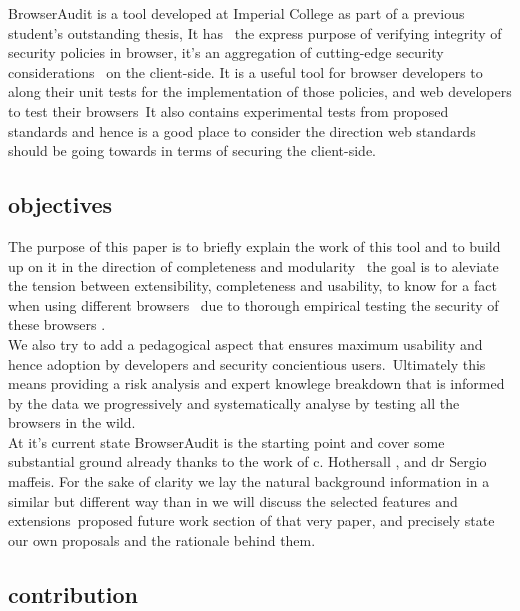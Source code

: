 \documentclass[a4paper,12pt]{paper}
\begin{document}
BrowserAudit is a tool developed at Imperial College as part of a previous student's outstanding thesis, It has \
the express purpose of verifying integrity of security policies in browser, it's an aggregation of cutting-edge security considerations \ 
on the client-side. 
It is a useful tool for browser developers to along their unit tests for the implementation of those policies, and web developers to test their browsers\
It also contains experimental tests from proposed standards and hence is a good place to consider the direction web standards should be going towards in terms of securing the client-side.\


\subsection{objectives}

The purpose of this paper is to briefly explain the work of this tool and to build up on it in the direction of completeness and modularity \
the goal is to aleviate the tension between extensibility, completeness and usability, to know for a fact when using different browsers \
due to thorough  empirical testing the security of these browsers .\\


We also try to add a pedagogical aspect that ensures maximum usability and hence adoption by developers and security concientious users.\ 
Ultimately this means providing a risk analysis and expert knowlege breakdown that is informed by the data we progressively and systematically analyse by testing all the browsers in the wild.\\

At it's current state BrowserAudit is the starting point and cover some substantial ground already thanks to the work of c. Hothersall , and dr Sergio maffeis.
For the sake of clarity we lay the natural background information in a similar but different way than in \cite{maffeis}  we will discuss the selected features and extensions\
proposed future work section of that very paper, and precisely state our own proposals and the rationale behind them.\\

\subsection{contribution}
\end{document}
